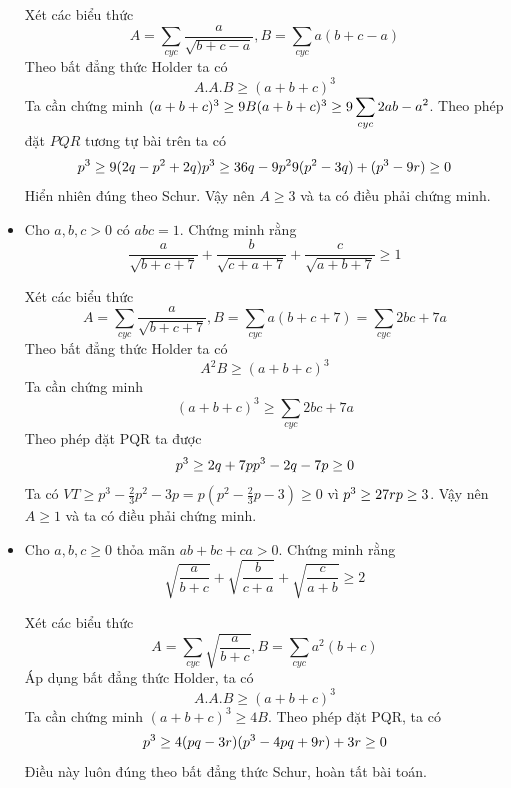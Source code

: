 \documentclass[11pt]{scrartcl}
\begin{document}
\begin{itemize}[label=, leftmargin=0em, itemsep=0.5em]
\begin{btvn}
        \end{btvn}
        \begin{sol}
            Xét các biểu thức
            \[
                A =\sum_{cyc} \frac{a}{\sqrt{b + c -a}}, B = \sum_{cyc}a(b + c -a)
            \]
            Theo bất đẳng thức Holder ta có 
            \[A.A.B \geq (a + b + c)^3\]
            Ta cần chứng minh $(a + b + c)^3 \geq 9B \lra (a + b + c)^3 \geq 9\displaystyle \sum_{cyc}2ab - a^2$. Theo phép đặt $PQR$ tương tự bài trên ta có 
            \[p^3 \geq 9(2q - p^2 + 2q)
            \lra p^3 \geq 36q - 9p^2 \lra 9(p^2 -3q) + (p^3 - 9r) \geq 0
            \]
            Hiển nhiên đúng theo Schur. Vậy nên $A \geq 3$ và ta có điều phải chứng minh.
        \end{sol}
        \item\begin{btvn}
            Cho $a,b,c > 0$ có $abc = 1$. Chứng minh rằng
            \[
                \frac{a}{\sqrt{b + c + 7}} + \frac{b}{\sqrt{c + a + 7}} + \frac{c}{\sqrt{a + b + 7}} \geq 1
            \]
        \end{btvn}
        \begin{sol}
            Xét các biểu thức 
            \[
                A = \sum_{cyc}\frac{a}{\sqrt{b + c + 7}}, B = \sum_{cyc} a(b + c + 7) = \sum_{cyc} 2bc + 7a
            \]
            Theo bất đẳng thức Holder ta có 
            \[
                A^2B \geq (a + b + c)^3
            \]
            Ta cần chứng minh
            \[
                (a + b + c)^3 \geq \sum_{cyc}2bc + 7a
            \]
            Theo phép đặt PQR ta được
            \[
                p^3 \geq 2q + 7p \lra p^3 - 2q - 7p \geq 0
            \]
            Ta có $VT \geq p^3 -\frac{2}{3}p^2 - 3p = p(p^2 - \frac{2}{3}p - 3) \geq 0$ vì $p^3 \geq 27r \lra p \geq 3$. Vậy nên $A \geq 1$ và ta có điều phải chứng minh.
        \end{sol}
        \item\begin{btvn}
            Cho $a,b,c \geq 0$ thỏa mãn $ab + bc + ca > 0$. Chứng minh rằng
            \[\sqrt{\frac{a}{b + c}} + \sqrt{\frac{b}{c + a}}+ \sqrt{\frac{c}{a+ b}} \geq 2
            \]
        \end{btvn}
        \begin{sol}
            Xét các biểu thức
            \[
                A = \sum_{cyc} \sqrt{\frac{a}{b + c}},
                B = \sum_{cyc} a^2( b + c)
            \]
            Áp dụng bất đẳng thức Holder, ta có
            \[
                A.A.B \geq (a + b + c)^3
            \]
            Ta cần chứng minh $(a + b + c)^3 \geq 4B$. Theo phép đặt PQR, ta có
            \[
                p^3 \geq 4(pq - 3r) \lra (p^3 - 4pq + 9r) + 3r \geq 0
            \]
            Điều này luôn đúng theo bất đẳng thức Schur, hoàn tất bài toán.
        \end{sol}
    

\end{itemize}
\end{document}
